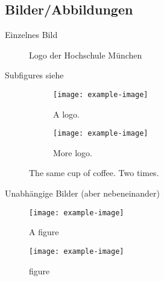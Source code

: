 \subsection{Bilder/Abbildungen}\label{subsec:abbildungen}
	
Einzelnes Bild
	
\begin{figure}[H]
	\centering
	\begin{minipage}{0.6\textwidth}
		\centering
	\end{minipage}
	\caption{Logo der Hochschule München}
  	\label{fig:logo}
\end{figure}
	
Subfigures siehe 
	
\begin{figure}[H]
  	\centering
  	\begin{subfigure}[b]{0.4\textwidth}
    	\texttt{[image: example-image]}
    	\caption{A logo.}
  	\end{subfigure}
  	\begin{subfigure}[b]{0.4\textwidth}
    	\texttt{[image: example-image]}
    	\caption{More logo.}
  	\end{subfigure}
  	\caption{The same cup of coffee. Two times.}
  	\label{fig:coffee}
\end{figure}
	
Unabhängige Bilder (aber nebeneinander)
	
\begin{figure}[H]
	\centering
	\begin{minipage}{.5\textwidth}
  		\centering
  		\texttt{[image: example-image]}
  		\caption{A figure}
  		\label{fig:test1}
	\end{minipage}%
	\begin{minipage}{.5\textwidth}
  		\centering
  		\texttt{[image: example-image]}
  		\caption{figure}
  		\label{fig:test2}
	\end{minipage}
\end{figure}
